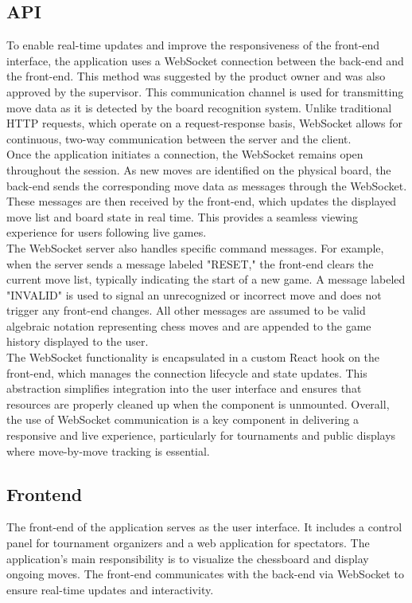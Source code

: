 \subsection{API}
To enable real-time updates and improve the responsiveness of the front-end interface, the application uses a WebSocket connection between the back-end and the front-end. This method was suggested by the product owner and was also approved by the supervisor. This communication channel is used for transmitting move data as it is detected by the board recognition system. Unlike traditional HTTP requests, which operate on a request-response basis, WebSocket allows for continuous, two-way communication between the server and the client. \\

Once the application initiates a connection, the WebSocket remains open throughout the session. As new moves are identified on the physical board, the back-end sends the corresponding move data as messages through the WebSocket. These messages are then received by the front-end, which updates the displayed move list and board state in real time. This provides a seamless viewing experience for users following live games. \\

The WebSocket server also handles specific command messages. For example, when the server sends a message labeled "RESET," the front-end clears the current move list, typically indicating the start of a new game. A message labeled "INVALID" is used to signal an unrecognized or incorrect move and does not trigger any front-end changes. All other messages are assumed to be valid algebraic notation representing chess moves and are appended to the game history displayed to the user. \\

The WebSocket functionality is encapsulated in a custom React hook on the front-end, which manages the connection lifecycle and state updates. This abstraction simplifies integration into the user interface and ensures that resources are properly cleaned up when the component is unmounted. Overall, the use of WebSocket communication is a key component in delivering a responsive and live experience, particularly for tournaments and public displays where move-by-move tracking is essential.

\subsection{Frontend}
The front-end of the application serves as the user interface. It includes a control panel for tournament organizers and a web application for spectators. The application's main responsibility is to visualize the chessboard and display ongoing moves. The front-end communicates with the back-end via WebSocket to ensure real-time updates and interactivity. \\

